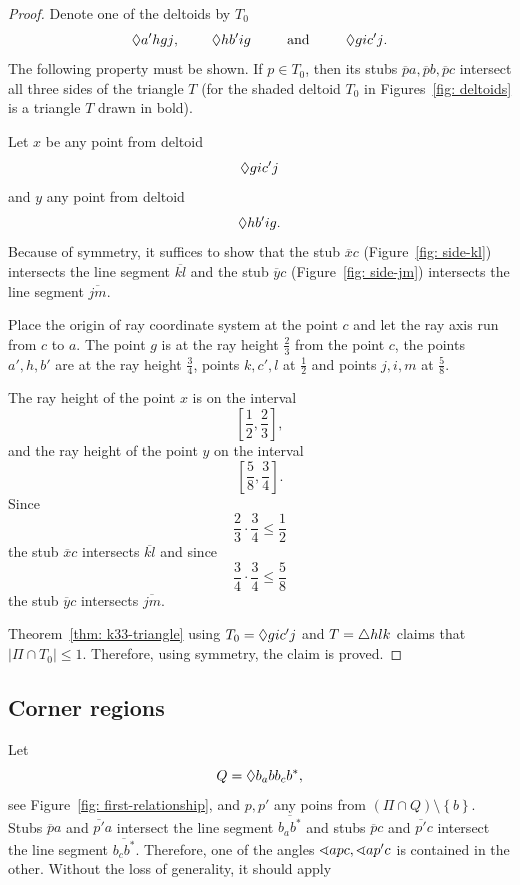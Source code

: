 \begin{proof}
Denote one of the deltoids by $T_{0}$
$$
  \Diamond{a'hgj},\text{\hspace{0.8cm}} \Diamond{hb'ig}\text{\hspace{0.8cm}   and   \hspace{0.8cm}} \Diamond{gic'j}.
$$
The following property must be shown. If $p \in T_{0}$, then its stubs $\overline{p}a,\overline{p}b,\overline{p}c$ intersect all three sides of the triangle $T$ (for the shaded deltoid $T_{0}$ in Figures~\ref{fig: deltoids} is a triangle $T$ drawn in bold).

Let $x$ be any point from deltoid
$$
  \Diamond{gic'j}
$$
and $y$ any point from deltoid
$$
  \Diamond{hb'ig}.
$$
Because of symmetry, it suffices to show that the stub $\overline{x}c$ (Figure~\ref{fig: side-kl}) intersects the line segment $\overline{kl}$ and the stub $\overline{y}c$ (Figure~\ref{fig: side-jm}) intersects the line segment $\overline{jm}$.

Place the origin of ray coordinate system at the point $c$ and let the ray axis run from $c$ to $a$. The point $g$ is at the ray height $\frac{2}{3}$ from the point $c$, the points $a',h,b'$ are at the ray height $\frac{3}{4}$, points $k, c', l$ at $\frac{1}{2}$ and points $j,i,m$ at $\frac{5}{8}$.

The ray height of the point $x$ is on the interval
$$
  \left[\frac{1}{2}, \frac{2}{3}\right],
$$
and the ray height of the point $y$ on the interval
$$
  \left[\frac{5}{8}, \frac{3}{4}\right].
$$
Since
$$
  \frac{2}{3} \cdot \frac{3}{4} \leq \frac{1}{2}
$$
the stub $\overline{x}c$ intersects $\overline{kl}$ and since
$$
  \frac{3}{4} \cdot \frac{3}{4} \leq \frac{5}{8}
$$
the stub $\overline{y}c$ intersects $\overline{jm}$.

Theorem~\ref{thm: k33-triangle} using $T_{0} = \Diamond{gic'j}$ and $T = \triangle{hlk}$ claims that $|\Pi \cap T_{0}| \leq 1$. Therefore, using symmetry, the claim is proved.
\end{proof}

\subsection{Corner regions}
Let
$$
Q = \Diamond{b_{a}bb_{c}b^{*}},
$$
see Figure~\ref{fig: first-relationship}, and $p,p'$ any poins from $\left(\Pi \cap Q\right) \setminus \left\{ b \right\}$. Stubs $\overline{p}a$ and $\overline{p'}a$ intersect the line segment $\overline{b_{a}b^{*}}$ and stubs $\overline{p}c$ and $\overline{p'}c$ intersect the line segment $\overline{b_{c}b^{*}}$. Therefore, one of the angles $\sphericalangle{apc}, \sphericalangle{ap'c}$ is contained in the other. Without the loss of generality, it should apply

